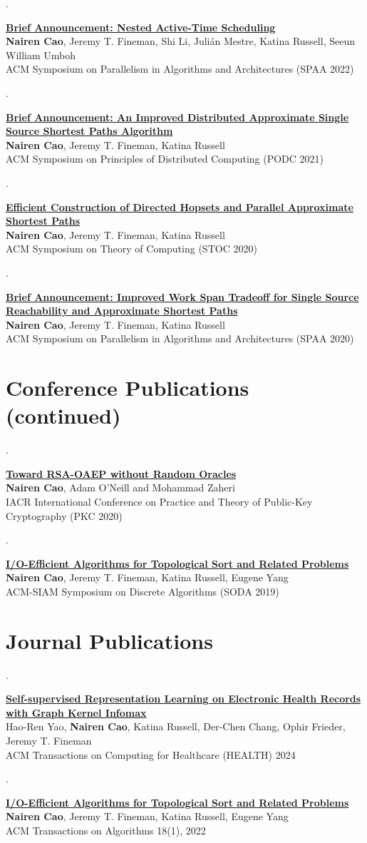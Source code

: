 \documentclass[10pt,a4paper]{article}
\newcounter{pub}
\newcommand{\publication}[3]{\stepcounter{pub}\begin{samepage}\noindent\begin{minipage}[t]{0.045\linewidth}\sffamily\small\color{muted}\thepub.\end{minipage}\begin{minipage}[t]{0.95\linewidth}\textbf{#1}\\#2\\{\small\sffamily\color{ink}#3}\end{minipage}\par\vspace{7pt}\end{samepage}}
\begin{document}
\publication{\href{https://dl.acm.org/doi/abs/10.1145/3490148.3538554}{Brief Announcement: Nested Active-Time Scheduling}}{\textbf{Nairen Cao}, Jeremy T. Fineman, Shi Li, Julián Mestre, Katina Russell, Seeun William Umboh}{ACM Symposium on Parallelism in Algorithms and Architectures (SPAA 2022)}
\publication{\href{https://dl.acm.org/doi/10.1145/3465084.3467945}{Brief Announcement: An Improved Distributed Approximate Single Source Shortest Paths Algorithm}}{\textbf{Nairen Cao}, Jeremy T. Fineman, Katina Russell}{ACM Symposium on Principles of Distributed Computing (PODC 2021)}
\publication{\href{https://dl.acm.org/doi/10.1145/3357713.3384270}{Efficient Construction of Directed Hopsets and Parallel Approximate Shortest Paths}}{\textbf{Nairen Cao}, Jeremy T. Fineman, Katina Russell}{ACM Symposium on Theory of Computing (STOC 2020)}
\publication{\href{https://dl.acm.org/doi/10.1145/3350755.3400222}{Brief Announcement: Improved Work Span Tradeoff for Single Source Reachability and Approximate Shortest Paths}}{\textbf{Nairen Cao}, Jeremy T. Fineman, Katina Russell}{ACM Symposium on Parallelism in Algorithms and Architectures (SPAA 2020)}
\newpage
\section{Conference Publications (continued)}
\publication{\href{https://link.springer.com/chapter/10.1007/978-3-030-45374-9_10}{Toward RSA-OAEP without Random Oracles}}{\textbf{Nairen Cao}, Adam O'Neill and Mohammad Zaheri}{IACR International Conference on Practice and Theory of Public-Key Cryptography (PKC 2020)}
\publication{\href{https://nairenc.github.io/nairenc_files/iotopologicalsort.pdf}{I/O-Efficient Algorithms for Topological Sort and Related Problems}}{\textbf{Nairen Cao}, Jeremy T. Fineman, Katina Russell, Eugene Yang}{ACM-SIAM Symposium on Discrete Algorithms (SODA 2019)}
\section{Journal Publications}
\publication{\href{https://dl.acm.org/doi/10.1145/3648695}{Self-supervised Representation Learning on Electronic Health Records with Graph Kernel Infomax}}{Hao-Ren Yao, \textbf{Nairen Cao}, Katina Russell, Der-Chen Chang, Ophir Frieder, Jeremy T. Fineman}{ACM Transactions on Computing for Healthcare (HEALTH) 2024}
\publication{\href{https://doi.org/10.1145/3418356}{I/O-Efficient Algorithms for Topological Sort and Related Problems}}{\textbf{Nairen Cao}, Jeremy T. Fineman, Katina Russell, Eugene Yang}{ACM Transactions on Algorithms 18(1), 2022}
\end{document}
